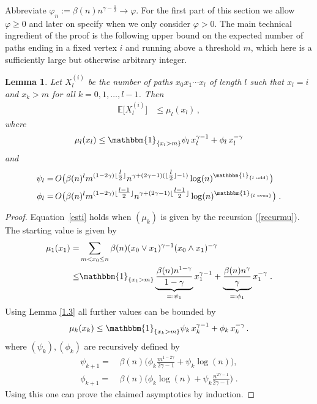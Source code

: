 \documentclass[12pt,a4paper]{article}
\numberwithin{equation}{section}
\newtheorem{lemma}[shared]{Lemma}
\begin{document}
Abbreviate  $\varphi_n:=\beta(n)n^{\gamma-\tfrac12}\to \varphi$.
For the first part of this section we allow $\varphi\ge0$ and later on specify when we only consider $\varphi>0$. The main technical ingredient of the proof is the following upper bound on the expected number of paths ending in a fixed vertex $i$ and running above a threshold $m$, which here is a sufficiently large but otherwise arbitrary integer. 

\begin{lemma}
  Let $X_l^{(i)}$ be the number of paths $x_0x_1\cdots x_l$ of length $l$ such that $x_l=i$ and $x_k>m$ for all $k=0,1,\ldots,l-1$. Then
  \begin{align}\label{esti}
		\mathbb E\big[X^{(i)}_l\big]&\le \mu_l(x_l) \,,
\end{align}
where
$$ \mu_l(x_l) \le \mathbbm{1}_{\{x_l > m\}}\psi_l\, x_{l}^{\gamma-1}+\phi_l\, x_{l}^{-\gamma}$$
and 
\begin{equation} \label{intermedrec}
    \begin{aligned}
    \psi_{l} = &\,O\big(\beta(n)^{l}m^{(1-2\gamma)\lfloor \tfrac{l}2 \rfloor}n^{\gamma + (2\gamma-1)(\lfloor \tfrac{l}2 \rfloor-1)}\log(n)^{\mathbbm{1}_{\{l \text{ odd}\}}}\big) \\
    \phi_{l} = &\,O\big(\beta(n)^{l}m^{(1-2\gamma)\lfloor \tfrac{l-1}2 \rfloor}n^{\gamma + (2\gamma-1)\lfloor \tfrac{l-1}2 \rfloor}\log(n)^{\mathbbm{1}_{\{l \text{ even}\}}}\big)\;.
\end{aligned}
\end{equation} 
\end{lemma}

\begin{proof}
Equation~\eqref{esti} holds when $(\mu_k)$ is given by the recursion (\ref{recurmu}).
The starting value is given by 
\begin{align*}
    \mu_1(x_1)= & \sum_{m<x_{0}\le n} \beta(n)(x_0 \vee x_{1})^{\gamma-1}(x_0 \wedge x_{1})^{-\gamma}
		\\ \le & \mathbbm{1}_{\{x_1 > m\}}\underbrace{\frac{\beta(n) n^{1-\gamma}}{1-\gamma}}_{=:\psi_1} x_{1}^{\gamma-1}+\underbrace{\frac{\beta(n) n^{\gamma}}{\gamma}}_{=:\phi_1} x_{1}^{-\gamma} \;.
\end{align*}
Using Lemma \ref{1.3} all further values can be bounded by 
$$ \mu_k(x_k) \le \mathbbm{1}_{\{x_k > m\}}\psi_k\, x_{k}^{\gamma-1}+\phi_k\, x_{k}^{-\gamma} \,.$$
where $(\psi_k), (\phi_k)$ are recursively defined by 
\begin{align*}
    \psi_{k+1} = &\,\beta(n)\big(\phi_k \frac{m^{1-2\gamma}}{2\gamma-1}+\psi_k\log(n)\big), \\
    \phi_{k+1} = &\,\beta(n)\big(\phi_k\log(n) +\psi_k\frac{n^{2\gamma-1}}{2\gamma-1}\big)\;.
\end{align*}
Using this one can prove the claimed asymptotics by induction.
\end{proof}
\end{document}
